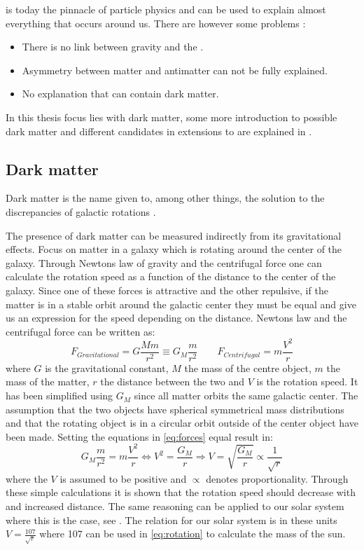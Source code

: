 \abbrSM is today the pinnacle of particle physics and can be used to explain almost everything that occurs around us. There are however some problems \citep{Jungman:1996}:
\begin{itemize}
\item There is no link between gravity and the \abbrSM.
\item Asymmetry between matter and antimatter can not be fully explained.
\item No explanation that can contain dark matter.
\end{itemize} 
In this thesis focus lies with dark matter, some more introduction to possible dark matter and different candidates in extensions to \abbrSM are explained in .


\subsection{Dark matter}\label{sec:tb:subsec:dark}
Dark matter is the name given to, among other things, the solution to the discrepancies of galactic rotations \citep{darkmatter}.

The presence of dark matter can be measured indirectly from its gravitational effects. Focus on matter in a galaxy which is rotating around the center of the galaxy. Through Newtons law of gravity and the centrifugal force one can calculate the rotation speed as a function of the distance to the center of the galaxy. Since one of these forces is attractive and the other repulsive, if the matter is in a stable orbit around the galactic center they must be equal and give us an expression for the speed depending on the distance. Newtons law and the centrifugal force can be written as:
\begin{equation}\label{eq:forces}
F_{Gravitational}=G \frac{M m}{r^2} \equiv G_M \frac{m}{r^2} \qquad F_{Centrifugal} = m\frac{V^2}{r}
\end{equation}
where $G$ is the gravitational constant, $M$ the mass of the centre object, $m$ the mass of the matter, $r$ the distance between the two and $V$ is the rotation speed. It has been simplified using $G_M$ since all matter orbits the same galactic center. The assumption that the two objects have spherical symmetrical mass distributions and that the rotating object is in a circular orbit outside of the center object have been made. Setting the equations in \eqref{eq:forces} equal result in:
\begin{equation}\label{eq:rotation}
G_M \frac{m}{r^2} = m\frac{V^2}{r} \Leftrightarrow V^2 =\frac{G_M}{r} \Rightarrow V=\sqrt{\frac{G_M}{r}} \propto \frac{1}{\sqrt{r}}
\end{equation}
where the $V$ is assumed to be positive and $\propto$ denotes proportionality. Through these simple calculations it is shown that the rotation speed should decrease with and increased distance. The same reasoning can be applied to our solar system where this is the case, see . The relation for our solar system is in these units $V=\frac{107}{\sqrt{r}}$ where 107 can be used in \eqref{eq:rotation} to calculate the mass of the sun.

